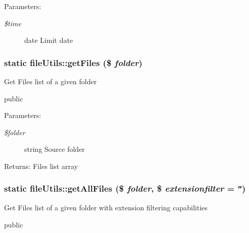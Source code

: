 \begin{Desc}
\item[Parameters:]
\begin{description}
\item[{\em \$time}]date Limit date \end{description}
\end{Desc}
\hypertarget{classfileUtils_0c8875ede13b6dc57d60c62c2bbb16af}{
\subsubsection[getFiles]{\setlength{\rightskip}{0pt plus 5cm}static fileUtils::getFiles (\$ {\em folder})}}
\label{classfileUtils_0c8875ede13b6dc57d60c62c2bbb16af}


Get Files list of a given folder

public

\begin{Desc}
\item[Parameters:]
\begin{description}
\item[{\em \$folder}]string Source folder \end{description}
\end{Desc}
\begin{Desc}
\item[Returns:]Files list array \end{Desc}
\hypertarget{classfileUtils_e093c5c265070d4ad5739bd1f649b4b8}{
\subsubsection[getAllFiles]{\setlength{\rightskip}{0pt plus 5cm}static fileUtils::getAllFiles (\$ {\em folder}, \/  \$ {\em extensionfilter} = {\tt ''})}}
\label{classfileUtils_e093c5c265070d4ad5739bd1f649b4b8}


Get Files list of a given folder with extension filtering capabilities

public

